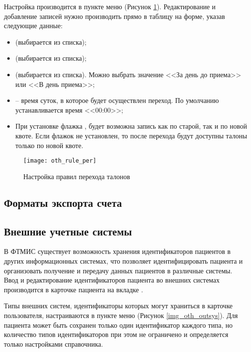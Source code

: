 Настройка производится в пункте меню  (Рисунок \ref{img_oth_rule_per}). Редактирование и добавление записей нужно производить прямо в таблицу на форме, указав следующие данные:
\begin{itemize}
 \item {} (выбирается из списка);
 \item {} (выбирается из списка);
 \item {} (выбирается из списка). Можно выбрать значение <<За день до приема>> или <<В день приема>>;
 \item {} – время суток, в которое будет осуществлен переход. По умолчанию устанавливается время <<00:00>>;
 \item При установке флажка , будет возможна запись как по старой, так и по новой квоте. Если флажок не установлен, то после перехода будут доступны талоны только по новой квоте.
\end{itemize}

\begin{figure}[ht]\centering
 \texttt{[image: oth\_rule\_per]}
 \caption{Настройка правил перехода талонов}
 \label{img_oth_rule_per}
\end{figure}

\subsection{Форматы экспорта счета}

\subsection{Внешние учетные системы} \label{oth_outsys}

В ФТМИС существует возможность хранения идентификаторов пациентов в других информационных системах, что позволяет идентифицировать пациента и организовать получение и передачу данных пациентов в различные системы. Ввод и редактирование идентификаторов пациента во внешних системах производится в карточке пациента на вкладке .

Типы внешних систем, идентификаторы которых могут храниться в карточке пользователя, настраиваются в пункте меню  (Рисунок \ref{img_oth_outsys}). Для пациента может быть сохранен только один идентификатор каждого типа, но количество типов идентификаторов при этом не ограничено и определяется только настройками справочника.

